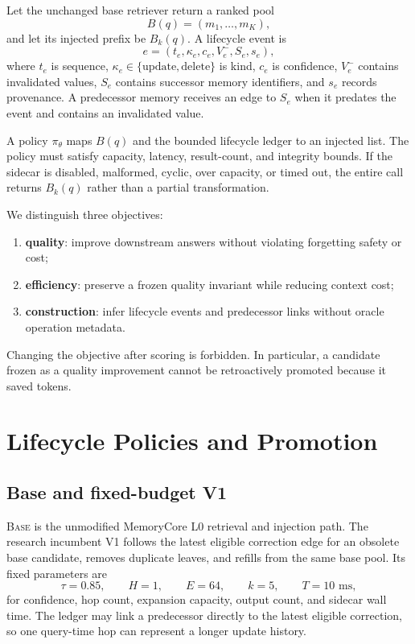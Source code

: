 \documentclass[10pt]{article}
\newcommand{\base}{\textsc{Base}\xspace}
\newcommand{\vone}{\textsc{V1}\xspace}
\begin{document}
Let the unchanged base retriever return a ranked pool
\[
B(q)=(m_1,\ldots,m_K),
\]
and let its injected prefix be $B_k(q)$. A lifecycle event is
\[
e=(t_e,\kappa_e,c_e,V_e^{-},S_e,s_e),
\]
where $t_e$ is sequence, $\kappa_e\in\{\text{update},\text{delete}\}$ is kind, $c_e$ is confidence, $V_e^{-}$ contains invalidated values, $S_e$ contains successor memory identifiers, and $s_e$ records provenance. A predecessor memory receives an edge to $S_e$ when it predates the event and contains an invalidated value.

A policy $\pi_\theta$ maps $B(q)$ and the bounded lifecycle ledger to an injected list. The policy must satisfy capacity, latency, result-count, and integrity bounds. If the sidecar is disabled, malformed, cyclic, over capacity, or timed out, the entire call returns $B_k(q)$ rather than a partial transformation.

We distinguish three objectives:
\begin{enumerate}
  \item \textbf{quality}: improve downstream answers without violating forgetting safety or cost;
  \item \textbf{efficiency}: preserve a frozen quality invariant while reducing context cost;
  \item \textbf{construction}: infer lifecycle events and predecessor links without oracle operation metadata.
\end{enumerate}
Changing the objective after scoring is forbidden. In particular, a candidate frozen as a quality improvement cannot be retroactively promoted because it saved tokens.

\section{Lifecycle Policies and Promotion}

\subsection{Base and fixed-budget V1}

\base is the unmodified MemoryCore L0 retrieval and injection path. The research incumbent \vone follows the latest eligible correction edge for an obsolete base candidate, removes duplicate leaves, and refills from the same base pool. Its fixed parameters are
\[
\tau=0.85,\qquad H=1,\qquad E=64,\qquad k=5,\qquad T=10\text{ ms},
\]
for confidence, hop count, expansion capacity, output count, and sidecar wall time. The ledger may link a predecessor directly to the latest eligible correction, so one query-time hop can represent a longer update history.
\end{document}
